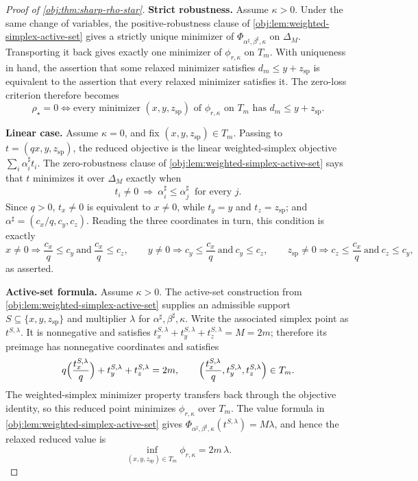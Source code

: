 \documentclass[11pt]{article}
\begin{document}
\begin{proof}[Proof of \cref{obj:thm:sharp-rho-star}]
\textbf{Strict robustness.}
Assume \(\kappa>0\).  Under the same change of variables, the positive-robustness clause of \cref{obj:lem:weighted-simplex-active-set} gives a strictly unique minimizer of \(\Phi_{\alpha^\sharp,\beta^\sharp,\kappa}\) on \(\Delta_M\).  Transporting it back gives exactly one minimizer of \(\phi_{r,\kappa}\) on \(T_m\). %
With uniqueness in hand, the assertion that some relaxed minimizer satisfies \(d_m\le y+z_{\mathrm{sp}}\) is equivalent to the assertion that every relaxed minimizer satisfies it.  The zero-loss criterion therefore becomes
\[
\rho_\star=0
\iff
\text{every minimizer }(x,y,z_{\mathrm{sp}})\text{ of }\phi_{r,\kappa}\text{ on }T_m\text{ has }d_m\le y+z_{\mathrm{sp}} .
\]

\textbf{Linear case.}
Assume \(\kappa=0\), and fix \((x,y,z_{\mathrm{sp}})\in T_m\).  Passing to \(t=(qx,y,z_{\mathrm{sp}})\), the reduced objective is the linear weighted-simplex objective \(\sum_i\alpha^\sharp_i t_i\).  The zero-robustness clause of \cref{obj:lem:weighted-simplex-active-set} says that \(t\) minimizes it over \(\Delta_M\) exactly when
\[
t_i\ne0\ \Longrightarrow\ \alpha^\sharp_i\le\alpha^\sharp_j\ \text{ for every }j .
\]
Since \(q>0\), \(t_x\ne0\) is equivalent to \(x\ne0\), while \(t_y=y\) and \(t_z=z_{\mathrm{sp}}\); and \(\alpha^\sharp=(c_x/q,c_y,c_z)\).  Reading the three coordinates in turn, this condition is exactly
\[
x\ne0\Rightarrow\frac{c_x}{q}\le c_y\ \text{and}\ \frac{c_x}{q}\le c_z,
\qquad
y\ne0\Rightarrow c_y\le\frac{c_x}{q}\ \text{and}\ c_y\le c_z,
\qquad
z_{\mathrm{sp}}\ne0\Rightarrow c_z\le\frac{c_x}{q}\ \text{and}\ c_z\le c_y,
\]
as asserted. %

\textbf{Active-set formula.}
Assume \(\kappa>0\).  The active-set construction from \cref{obj:lem:weighted-simplex-active-set} supplies an admissible support \(S\subseteq\{x,y,z_{\mathrm{sp}}\}\) and multiplier \(\lambda\) for \(\alpha^\sharp,\beta^\sharp,\kappa\).  Write the associated simplex point as \(t^{S,\lambda}\).  It is nonnegative and satisfies \(t^{S,\lambda}_x+t^{S,\lambda}_y+t^{S,\lambda}_z=M=2m\); therefore its preimage has nonnegative coordinates and satisfies
\[
q\Bigl(\frac{t_x^{S,\lambda}}{q}\Bigr)+t_y^{S,\lambda}+t_z^{S,\lambda}=2m,
\qquad
\Bigl(\frac{t_x^{S,\lambda}}{q},t_y^{S,\lambda},t_z^{S,\lambda}\Bigr)\in T_m .
\]
The weighted-simplex minimizer property transfers back through the objective identity, so this reduced point minimizes \(\phi_{r,\kappa}\) over \(T_m\).  The value formula in \cref{obj:lem:weighted-simplex-active-set} gives \(\Phi_{\alpha^\sharp,\beta^\sharp,\kappa}(t^{S,\lambda})=M\lambda\), and hence the relaxed reduced value is
\[
\inf_{(x,y,z_{\mathrm{sp}})\in T_m}\phi_{r,\kappa}=2m\,\lambda .
\]


\end{proof}
\end{document}
